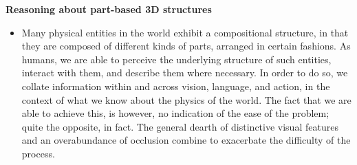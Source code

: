 \documentclass[10pt]{article}
\newenvironment{researchBlock}[1]{%
  \vspace*{0.5ex}
  {\noindent\large \textbf{#1}}
  \begin{itemize}\item}
  {\end{itemize}\vspace{3ex}}
\begin{document}
\begin{researchBlock} {Reasoning about part-based 3D structures}
  Many physical entities in the world exhibit a compositional structure, in
  that they are composed of different kinds of parts, arranged in certain
  fashions.
  As humans, we are able to perceive the underlying structure of such entities,
  interact with them, and describe them where necessary.
  In order to do so, we collate information within and across vision, language,
  and action, in the context of what we know about the physics of the world.
  The fact that we are able to achieve this, is however, no indication of the
  ease of the problem; quite the opposite, in fact.
  The general dearth of distinctive visual features and an overabundance of
  occlusion combine to exacerbate the difficulty of the process.


\end{researchBlock}
\end{document}
